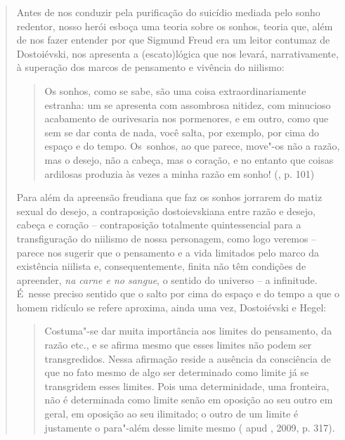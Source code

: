 {\begin{quote}
Antes de nos conduzir pela purificação do suicídio mediada pelo sonho
redentor, nosso herói esboça uma teoria sobre os sonhos, teoria que,
além de nos fazer entender por que Sigmund Freud era um leitor contumaz
de Dostoiévski, nos apresenta a (escato)lógica que nos levará,
narrativamente, à superação dos marcos de pensamento e vivência do
niilismo:

\begin{quote}
Os sonhos, como se sabe, são uma coisa extraordinariamente estranha: um
se apresenta com assombrosa nitidez, com minucioso acabamento de
ourivesaria nos pormenores, e em outro, como que sem se dar conta de
nada, você salta, por exemplo, por cima do espaço e do tempo. Os~sonhos,
ao que parece, move"-os não a razão, mas o desejo, não a cabeça, mas o
coração, e no entanto que coisas ardilosas produzia às vezes a minha
razão em sonho! (, p. 101)
\end{quote}

Para além da apreensão freudiana que faz os sonhos jorrarem do matiz
sexual do desejo, a contraposição dostoievskiana entre razão e desejo,
cabeça e coração -- contraposição totalmente quintessencial para a
transfiguração do niilismo de nossa personagem, como logo veremos --
parece nos sugerir que o pensamento e a vida limitados pelo marco da
existência niilista e, consequentemente, finita não têm condições de
apreender, \emph{na carne e no sangue}, o sentido do universo -- a
infinitude. É~nesse preciso sentido que o salto por cima do espaço e do
tempo a que o homem ridículo se refere aproxima, ainda uma vez,
Dostoiévski e Hegel:

\begin{quote}
Costuma"-se dar muita importância aos limites do pensamento, da razão
etc., e se afirma mesmo que esses limites não podem ser transgredidos.
Nessa afirmação reside a ausência da consciência de que no fato mesmo de
algo ser determinado como limite já se transgridem esses limites. Pois
uma determinidade, uma fronteira, não é determinada como limite senão em
oposição ao seu outro em geral, em oposição ao seu ilimitado; o outro de
um limite é justamente o para"-além desse limite mesmo ( apud
, 2009, p. 317).
\end{quote}


\end{quote}}
